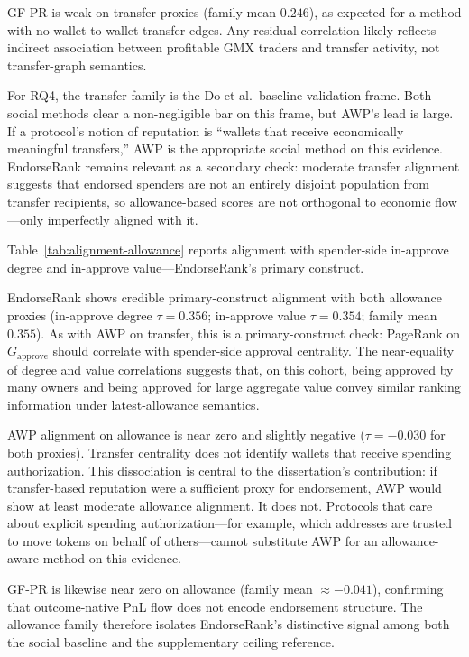 GF-PR is weak on transfer proxies (family mean $0.246$), as expected for a method with no wallet-to-wallet transfer edges. Any residual correlation likely reflects indirect association between profitable GMX traders and transfer activity, not transfer-graph semantics.

For RQ4, the transfer family is the Do et al.\ baseline validation frame. Both social methods clear a non-negligible bar on this frame, but AWP's lead is large. If a protocol's notion of reputation is ``wallets that receive economically meaningful transfers,'' AWP is the appropriate social method on this evidence. EndorseRank remains relevant as a secondary check: moderate transfer alignment suggests that endorsed spenders are not an entirely disjoint population from transfer recipients, so allowance-based scores are not orthogonal to economic flow---only imperfectly aligned with it.


Table~\ref{tab:alignment-allowance} reports alignment with spender-side in-approve degree and in-approve value---EndorseRank's primary construct.



EndorseRank shows credible primary-construct alignment with both allowance proxies (in-approve degree $\tau=0.356$; in-approve value $\tau=0.354$; family mean $0.355$). As with AWP on transfer, this is a primary-construct check: PageRank on $G_{\text{approve}}$ should correlate with spender-side approval centrality. The near-equality of degree and value correlations suggests that, on this cohort, being approved by many owners and being approved for large aggregate value convey similar ranking information under latest-allowance semantics.

AWP alignment on allowance is near zero and slightly negative ($\tau=-0.030$ for both proxies). Transfer centrality does not identify wallets that receive spending authorization. This dissociation is central to the dissertation's contribution: if transfer-based reputation were a sufficient proxy for endorsement, AWP would show at least moderate allowance alignment. It does not. Protocols that care about explicit spending authorization---for example, which addresses are trusted to move tokens on behalf of others---cannot substitute AWP for an allowance-aware method on this evidence.

GF-PR is likewise near zero on allowance (family mean $\approx -0.041$), confirming that outcome-native PnL flow does not encode endorsement structure. The allowance family therefore isolates EndorseRank's distinctive signal among both the social baseline and the supplementary ceiling reference.

